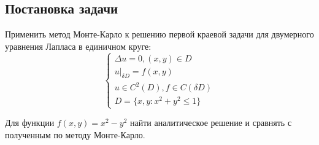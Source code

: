 \documentclass[11pt]{article}
\begin{document}
\subsection{Постановка задачи}
Применить метод Монте-Карло к решению первой краевой задачи для двумерного уравнения Лапласа в единичном круге:
\begin{equation}
\begin{cases}
\Delta u = 0,(x,y) \in D \\
u|_{\delta D} = f(x,y) \\
u \in C^2(D), f \in C(\delta D)\\
D = \{x,y: x^2 + y^2 \leq 1 \}
\end{cases}
\end{equation}

Для функции $f(x,y) = x^2 - y^2$ найти аналитическое решение и сравнять с полученным по методу Монте-Карло.
 
\end{document}
